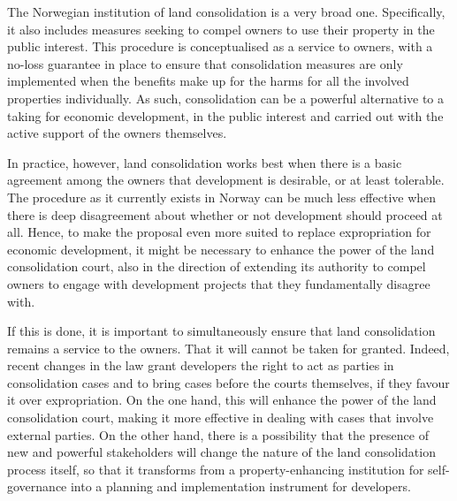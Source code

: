 
The Norwegian institution of land consolidation is a very broad one. Specifically, it also includes  measures seeking to compel owners to use their property in the public interest. This procedure is conceptualised as a service to owners, with a no-loss guarantee in place to ensure that consolidation measures are only implemented when the benefits make up for the harms for all the involved properties individually. As such, consolidation can be a powerful alternative to a taking for economic development, in the public interest and carried out with the active support of the owners themselves.

In practice, however, land consolidation works best when there is a basic agreement among the owners that development is desirable, or at least tolerable. The procedure as it currently exists in Norway   can be much less effective when there is deep disagreement about whether or not development should proceed at all. Hence, to make the proposal even more suited to replace expropriation for economic development, it might be necessary to enhance the power of the land consolidation court, also in the direction of extending its authority to compel owners to engage with development projects that they fundamentally disagree with.


If this is done, it is important to simultaneously ensure that land consolidation remains a service to the owners. That it will cannot be taken for granted. Indeed, recent changes in the law grant developers the right to act as parties in consolidation cases and to bring cases before the courts themselves, if they favour it over expropriation. On the one hand, this will enhance the power of the land consolidation court, making it more effective in dealing with cases that involve external parties. On the other hand, there is a possibility that the presence of new and powerful stakeholders will change the nature of the land consolidation process itself, so that it transforms from a property-enhancing institution for self-governance into a planning and implementation instrument for developers.


